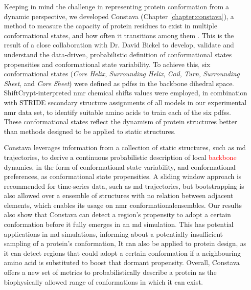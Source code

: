 Keeping in mind the challenge in representing protein \gls{conformation} from a dynamic perspective, we developed Constava (Chapter \ref{chapter:constava}), a method to measure the capacity of protein residues to exist in multiple conformational states, and how often it transitions among them \cite{gavalda-garcia_data-driven_2024}. This is the result of a close collaboration with Dr. David Bickel to develop, validate and understand the data-driven, probabilistic definition of conformational states propensities and conformational state variability. To achieve this, six conformational states (\textit{Core Helix}, \textit{Surrounding Helix}, \textit{Coil}, \textit{Turn}, \textit{Surrounding Sheet}, and \textit{Core Sheet}) were defined as \glspl{pdf}s in the backbone dihedral space. ShiftCrypt-interpreted \gls{nmr} chemical shifts \cite{orlando_shiftcrypt_2020} values were employed, in combination with STRIDE \cite{frishman_knowledge-based_1995} secondary structure assignments of all models in our experimental \gls{nmr} data set, to identify suitable amino acids to train each of the six \glspl{pdf}s. These conformational states reflect the dynamism of protein structures better than methods designed to be applied to static structures.


Constava leverages information from a collection of static structures, such as \gls{md} trajectories, to derive a continuous probabilistic description of local \textcolor{red}{backbone} \gls{dynamics}, in the form of conformational state variability, and conformational preferences, as conformational state propensities. A sliding window approach is recommended for time-series data, such as \gls{md} trajectories, but bootstrapping is also allowed over a ensemble of structures with no relation between adjacent elements, which enables its usage on \gls{nmr} \glspl{conformationalensemble}. Our results also show that Constava can detect a region's propensity to adopt a certain \gls{conformation} before it fully emerges in an \gls{md} simulation. This has potential applications in \gls{md} simulations, informing about a potentially insufficient sampling of a protein's \gls{conformation}, It can also be applied to protein design, as it can detect regions that could adopt a certain \gls{conformation} if a neighbouring amino acid is substituted to boost that dormant propensity. Overall, Constava offers a new set of metrics to probabilistically describe a protein as the biophysically allowed range of \glspl{conformation} in which it can exist.
